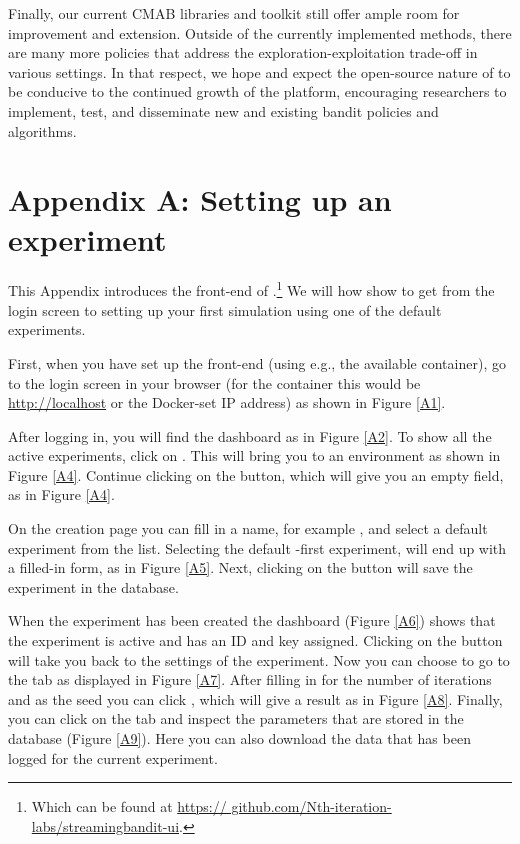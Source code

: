 \documentclass[nojss]{jss}
\begin{document}
Finally, our current CMAB libraries and toolkit still offer ample room for improvement and extension. Outside of the currently implemented methods, there are many more policies that address the exploration-exploitation trade-off in various settings. In that respect, we hope and expect the open-source nature of  to be conducive to the continued growth of the platform, encouraging researchers to implement, test, and disseminate new and existing bandit policies and algorithms.





\clearpage

\section*{Appendix A: Setting up an experiment}
\label{app:ui}

\renewcommand{\thefigure}{A\arabic{figure}}

\setcounter{figure}{0}

This Appendix introduces the front-end of .\footnote{Which can be found at \url{https:// github.com/Nth-iteration-labs/streamingbandit-ui}.} We will how show to get from the login screen to setting up your first simulation using one of the default experiments.

First, when you have set up the front-end (using e.g., the available  container), go to the login screen in your browser (for the  container this would be \url{http://localhost} or the Docker-set IP address) as shown in Figure \ref{A1}.

After logging in, you will find the dashboard as in Figure \ref{A2}. To show all the active experiments, click on . This will bring you to an environment as shown in Figure \ref{A4}. Continue clicking on the  button, which will give you an empty  field, as in Figure \ref{A4}.

On the creation page you can fill in a name, for example , and select a default experiment from the  list. Selecting the default -first experiment, will end up with a filled-in form, as in Figure \ref{A5}. Next, clicking on the  button will save the experiment in the database.

When the experiment has been created the dashboard (Figure \ref{A6}) shows that the experiment is active and has an ID and key assigned. Clicking on the  button will take you back to the settings of the experiment. Now you can choose to go to the  tab as displayed in Figure \ref{A7}. After filling in  for the number of iterations and  as the seed you can click , which will give a result as in Figure \ref{A8}. Finally, you can click on the  tab and inspect the parameters that are stored in the database (Figure \ref{A9}). Here you can also download the data that has been logged for the current experiment.
\end{document}
